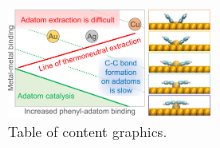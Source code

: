 \documentclass[aps,prb,amsmath,amssymb,11pt]{revtex4-1}
\begin{document}
\pagebreak



\pagebreak

\begin{figure}[h!]
\centering
\includegraphics[width=0.48\textwidth]{TOG/TOG-main.pdf}
\caption{Table of content graphics.} 
\label{fig:tog}
\end{figure}
\end{document}
